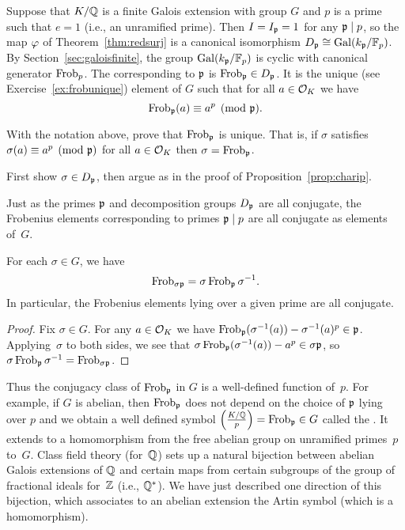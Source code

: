 Suppose that $K/\mathbb{Q}$ is a finite Galois extension with group $G$ and
$p$ is a prime such that $e=1$ (i.e., an unramified prime).  Then
$I=I_{\mathfrak{p}}=1$ for any $\mathfrak{p}\mid p$, so the map $\varphi$ of
Theorem~\ref{thm:redsurj}
is a canonical isomorphism $D_{\mathfrak{p}} \cong \operatorname{Gal}( k_{\mathfrak{p}}/\mathbb{F}_p)$.
By Section~\ref{sec:galoisfinite},
the group $\operatorname{Gal}( k_{\mathfrak{p}}/\mathbb{F}_p)$ is
cyclic with canonical generator $\operatorname{Frob}_p$.
The  corresponding to $\mathfrak{p}$ is
$\operatorname{Frob}_{\mathfrak{p}}\in D_{\mathfrak{p}}$. It is the unique (see Exercise~\ref{ex:frobunique})
element of $G$ such that for all
$a\in\mathcal{O}_K$ we have
$$
	\operatorname{Frob}_{\mathfrak{p}}(a)\equiv a^p\pmod{\mathfrak{p}}.
$$


\begin{exercise}\label{ex:frobunique}
	With the notation above, prove that $\operatorname{Frob}_{\mathfrak{p}}$ is
	unique. That is, if $\sigma$ satisfies
	$\sigma(a) \equiv a^p \pmod{\mathfrak{p}}$ for all $a\in\mathcal{O}_K$
	then $\sigma = \operatorname{Frob}_{\mathfrak{p}}$.

	\begin{hint}
		First show $\sigma\in D_{\mathfrak{p}}$, then argue as in
		the proof of Proposition~\ref{prop:charip}.
	\end{hint}
\end{exercise}


Just as the primes $\mathfrak{p}$ and decomposition groups $D_{\mathfrak{p}}$ are all
conjugate, the Frobenius elements corresponding to primes
$\mathfrak{p}\mid p$ are all conjugate as elements of~$G$.

\begin{proposition}
	For each $\sigma \in G$, we have
	$$
		\operatorname{Frob}_{\sigma\mathfrak{p}} = \sigma\operatorname{Frob}_{\mathfrak{p}}\sigma^{-1}.
	$$
	In particular, the Frobenius elements lying over a given
	prime are all conjugate.
\end{proposition}
\begin{proof}
	Fix $\sigma\in G$. For any $a\in\mathcal{O}_K$ we have
	$\operatorname{Frob}_{\mathfrak{p}}(\sigma^{-1}(a)) - \sigma^{-1}(a)^p \in \mathfrak{p}$.
	Applying~$\sigma$ to both sides, we see that
	$\sigma\operatorname{Frob}_{\mathfrak{p}}(\sigma^{-1}(a)) - a^p \in \sigma\mathfrak{p}$,
	so $\sigma\operatorname{Frob}_{\mathfrak{p}}\sigma^{-1} = \operatorname{Frob}_{\sigma \mathfrak{p}}$.
\end{proof}

Thus the conjugacy class of $\operatorname{Frob}_{\mathfrak{p}}$ in $G$ is a well-defined
function of~$p$.  For example, if $G$ is abelian, then $\operatorname{Frob}_{\mathfrak{p}}$ does
not depend on the choice of $\mathfrak{p}$ lying over $p$ and we obtain a well
defined symbol $\left(\frac{K/\mathbb{Q}}{p}\right) =\operatorname{Frob}_{\mathfrak{p}}\in G$ called the .  It extends to a homomorphism from the free abelian
group on unramified primes~$p$ to~$G$.
Class field theory (for~$\mathbb{Q}$) sets up a natural bijection
between abelian Galois extensions of $\mathbb{Q}$ and certain maps from
certain subgroups of the group of fractional ideals for~$\mathbb{Z}$ (i.e., $\mathbb{Q}^*$).
We have just described one direction of this bijection, which associates to an
abelian extension the Artin symbol (which is a homomorphism).


